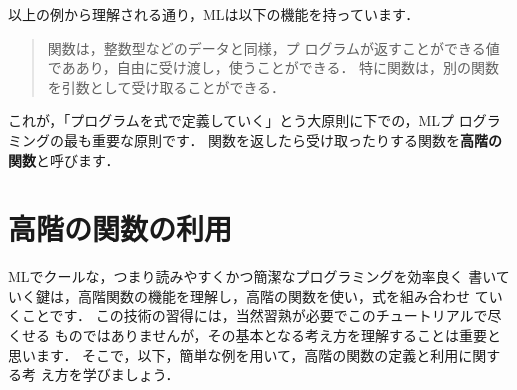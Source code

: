 \documentclass{jbook}
\begin{document}
	以上の例から理解される通り，MLは以下の機能を持っています．
\begin{quote}
	関数は，整数型などのデータと同様，プ
ログラムが返すことができる値でああり，自由に受け渡し，使うことができる．
	特に関数は，別の関数を引数として受け取ることができる．
\end{quote}
	これが，「プログラムを式で定義していく」とう大原則に下での，MLプ
ログラミングの最も重要な原則です．
	関数を返したら受け取ったりする関数を{\bf 高階の関数}と呼びます．

\section{高階の関数の利用}
\label{sec:tutorialHeigher-order-use}


	MLでクールな，つまり読みやすくかつ簡潔なプログラミングを効率良く
書いていく鍵は，高階関数の機能を理解し，高階の関数を使い，式を組み合わせ
ていくことです．
	この技術の習得には，当然習熟が必要でこのチュートリアルで尽くせる
ものではありませんが，その基本となる考え方を理解することは重要と思います．
	そこで，以下，簡単な例を用いて，高階の関数の定義と利用に関する考
え方を学びましょう．
\end{document}
